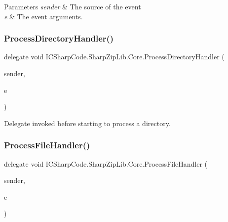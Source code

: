 \begin{DoxyParams}{Parameters}
{\em sender} & The source of the event\\
\hline
{\em e} & The event arguments.\\
\hline
\end{DoxyParams}
\mbox{\label{namespace_i_c_sharp_code_1_1_sharp_zip_lib_1_1_core_a37bb92cd3528127a005ef2ca4dd478f5}} 
\subsubsection{\texorpdfstring{Process\+Directory\+Handler()}{ProcessDirectoryHandler()}}
{\footnotesize\ttfamily delegate void I\+C\+Sharp\+Code.\+Sharp\+Zip\+Lib.\+Core.\+Process\+Directory\+Handler (\begin{DoxyParamCaption}\item[{object}]{sender,  }\item[{\hyperlink{class_i_c_sharp_code_1_1_sharp_zip_lib_1_1_core_1_1_directory_event_args}{Directory\+Event\+Args}}]{e }\end{DoxyParamCaption})}



Delegate invoked before starting to process a directory. 

\mbox{\label{namespace_i_c_sharp_code_1_1_sharp_zip_lib_1_1_core_abba22d663b2d9f4fa4bda2dc2e867bb4}} 
\subsubsection{\texorpdfstring{Process\+File\+Handler()}{ProcessFileHandler()}}
{\footnotesize\ttfamily delegate void I\+C\+Sharp\+Code.\+Sharp\+Zip\+Lib.\+Core.\+Process\+File\+Handler (\begin{DoxyParamCaption}\item[{object}]{sender,  }\item[{\hyperlink{class_i_c_sharp_code_1_1_sharp_zip_lib_1_1_core_1_1_scan_event_args}{Scan\+Event\+Args}}]{e }\end{DoxyParamCaption})}



